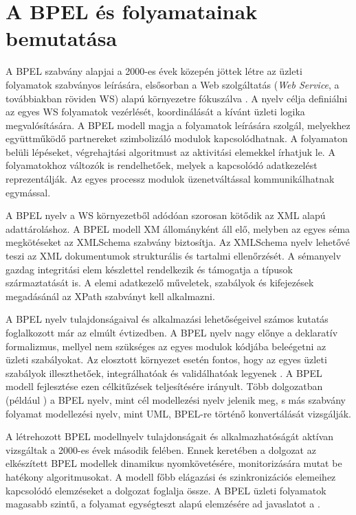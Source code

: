 
\chapter{A BPEL és folyamatainak bemutatása}

A BPEL szabvány alapjai a 2000-es évek közepén jöttek létre az üzleti folyamatok szabványos leírására, elsősorban a Web szolgáltatás (\textit{Web Service}, a továbbiakban röviden WS) alapú környezetre fókuszálva \cite{andrews2003business}. A nyelv célja definiálni az  egyes WS folyamatok vezérlését, koordinálását a kívánt üzleti logika megvalósítására.  A BPEL modell magja  a folyamatok leírására szolgál, melyekhez együttműködő partnereket szimbolizáló modulok kapcsolódhatnak. A folyamaton belüli lépéseket, végrehajtási algoritmust az aktivitási elemekkel írhatjuk le. A folyamatokhoz változók is rendelhetőek, melyek a kapcsolódó adatkezelést reprezentálják. Az egyes processz modulok üzenetváltással kommunikálhatnak egymással.   

A BPEL nyelv a WS környezetből adódóan szorosan kötődik az XML alapú adattároláshoz. A BPEL modell XM állományként áll elő, melyben az egyes séma megkötéseket az XMLSchema szabvány biztosítja. Az XMLSchema nyelv lehetővé teszi az XML dokumentumok strukturális és tartalmi ellenőrzését. A sémanyelv  gazdag integritási elem készlettel rendelkezik és támogatja a típusok származtatását is. A elemi adatkezelő műveletek, szabályok és kifejezések megadásánál az XPath szabványt kell alkalmazni.  

A BPEL nyelv tulajdonságaival és alkalmazási lehetőségeivel számos kutatás foglalkozott már az elmúlt évtizedben. A BPEL nyelv nagy előnye a deklaratív formalizmus, mellyel nem szükséges  az egyes modulok kódjába beleégetni az üzleti szabályokat. Az elosztott környezet esetén fontos, hogy az egyes üzleti szabályok illeszthetőek, integrálhatóak és validálhatóak legyenek \cite{rosenberg2005business}. A BPEL modell fejlesztése ezen célkitűzések teljesítésére irányult. Több dolgozatban (például \cite{ouyang2006translating}) a BPEL nyelv, mint cél modellezési nyelv jelenik meg, s más szabvány folyamat modellezési nyelv, mint UML, BPEL-re történő konvertálását vizsgálják.   

A létrehozott BPEL modellnyelv tulajdonságait és alkalmazhatóságát  aktívan vizsgáltak a 2000-es évek második felében. Ennek keretében a \cite{baresi2005towards} dolgozat az elkészített BPEL modellek dinamikus nyomkövetésére, monitorizására mutat be hatékony algoritmusokat. A modell főbb elágazási és szinkronizációs elemeihez kapcsolódó elemzéseket a \cite{ouyang2005wofbpel} dolgozat foglalja össze. A BPEL üzleti folyamatok magasabb szintű, a folyamat egységteszt alapú elemzésére ad javaslatot a \cite{mayer2006towards}.

